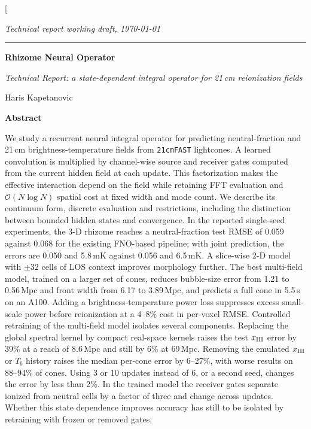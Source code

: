 \documentclass[10pt,a4paper,twocolumn]{article}
\begin{document}
\twocolumn[{%
  \begin{flushleft}
    {\small\itshape Technical report \textperiodcentered{} working draft, \today}\par
    \vspace{2pt}\rule{\textwidth}{0.5pt}\par
    \vspace{18pt}
    {\LARGE\bfseries Rhizome Neural Operator}\par
    \vspace{6pt}
    {\large\itshape Technical Report: a state-dependent integral operator for 21\,cm reionization fields}\par
    \vspace{12pt}
    Haris Kapetanovic\par
    \vspace{14pt}
  \end{flushleft}
  \noindent\hfill%
  \begin{minipage}{0.88\textwidth}
    \small
    {\centering\textbf{Abstract}\par}\vspace{3pt}
    We study a recurrent neural integral operator for predicting neutral-fraction and 21\,cm brightness-temperature fields from \texttt{21cmFAST} lightcones. A learned convolution is multiplied by channel-wise source and receiver gates computed from the current hidden field at each update. This factorization makes the effective interaction depend on the field while retaining FFT evaluation and $\mathcal{O}(N\log N)$ spatial cost at fixed width and mode count. We describe its continuum form, discrete evaluation and restrictions, including the distinction between bounded hidden states and convergence. In the reported single-seed experiments, the 3-D rhizome reaches a neutral-fraction test RMSE of 0.059 against 0.068 for the existing FNO-based pipeline; with joint prediction, the errors are 0.050 and 5.8\,mK against 0.056 and 6.5\,mK. A slice-wise 2-D model with $\pm32$ cells of LOS context improves morphology further. The best multi-field model, trained on a larger set of cones, reduces bubble-size error from 1.21 to 0.56\,Mpc and front width from 6.17 to 3.89\,Mpc, and predicts a full cone in 5.5\,s on an A100. Adding a brightness-temperature power loss suppresses excess small-scale power before reionization at a 4--8\% cost in per-voxel RMSE. Controlled retraining of the multi-field model isolates several components. Replacing the global spectral kernel by compact real-space kernels raises the test $x_{\mathrm{HI}}$ error by 39\% at a reach of 8.6\,Mpc and still by 6\% at 69\,Mpc. Removing the emulated $x_{\mathrm{HI}}$ or $T_b$ history raises the median per-cone error by 6--27\%, with worse results on 88--94\% of cones. Using 3 or 10 updates instead of 6, or a second seed, changes the error by less than 2\%. In the trained model the receiver gates separate ionized from neutral cells by a factor of three and change across updates. Whether this state dependence improves accuracy has still to be isolated by retraining with frozen or removed gates.\par

\end{minipage}}
\end{document}
